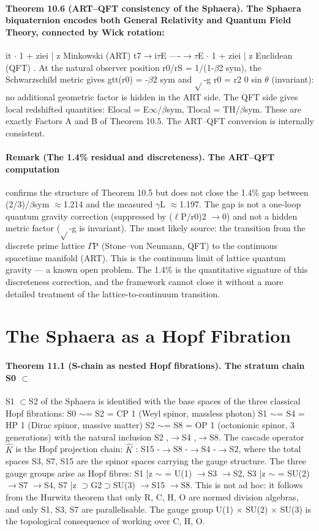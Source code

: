 \documentclass[12pt,a4paper]{article}
\begin{document}
\paragraph*{Theorem 10.6 (ART--QFT consistency of the Sphaera). The Sphaera biquaternion encodes both General Relativity and Quantum Field Theory, connected by Wick rotation:}
it $\cdot$ 1 + ziei | {z } Minkowski (ART) t7$\to$i$\tau$E ----$\to$$\tau$E $\cdot$ 1 + ziei | {z } Euclidean (QFT) . At the natural observer position r0/rS = 1/(1-$\beta$2 sym), the Schwarzschild metric gives gtt(r0) = -$\beta$2 sym and $\sqrt{}$-g
r0 = r2 0 sin $\theta$ (invariant): no additional geometric factor is hidden in the ART side. The QFT side gives local redshifted quantities: Elocal = E$\infty$/$\beta$sym, Tlocal = TH/$\beta$sym. These are exactly Factors A and B of Theorem 10.5. The ART--QFT conversion is internally consistent.
\paragraph*{Remark (The 1.4\% residual and discreteness). The ART--QFT computation}
confirms the structure of Theorem 10.5 but does not close the 1.4\% gap between (2/3)/$\beta$sym $\approx$1.214 and the measured $\gamma$L $\approx$1.197. The gap is not a one-loop
quantum gravity correction (suppressed by ($\ell$P/r0)2 $\to$0) and not a hidden metric factor ($\sqrt{}$-g is invariant). The most likely source: the transition from the discrete prime lattice $\Gamma$P (Stone--von Neumann, QFT) to the continuous spacetime manifold (ART). This is the continuum limit of lattice quantum gravity --- a known open problem. The 1.4\% is the quantitative signature of this discreteness correction, and the framework cannot close it without a more detailed treatment of the lattice-to-continuum transition.

\section{The Sphaera as a Hopf Fibration}
\paragraph*{Theorem 11.1 (S-chain as nested Hopf fibrations). The stratum chain S0 $\subset$}
S1 $\subset$S2 of the Sphaera is identified with the base spaces of the three classical Hopf fibrations: S0 $\sim$= S2 = CP 1 (Weyl spinor, massless photon) S1 $\sim$= S4 = HP 1 (Dirac spinor, massive matter) S2 $\sim$= S8 = OP 1 (octonionic spinor, 3 generations) with the natural inclusion S2 ,$\to$S4 ,$\to$S8. The cascade operator $\hat K$ is the Hopf projection chain: $\hat K$ : S15 -$\to$S8 -$\to$S4 -$\to$S2, where the total spaces S3, S7, S15 are the spinor spaces carrying the gauge structure. The three gauge groups arise as Hopf fibres: S1 |{z} $\sim$ = U(1) $\to$S3 $\to$S2, S3 |{z} $\sim$ = SU(2) $\to$S7 $\to$S4, S7 |{z} $\supset$G2$\supset$SU(3) $\to$S15 $\to$S8. This is not ad hoc: it follows from the Hurwitz theorem that only R, C, H, O are normed division algebras, and only S1, S3, S7 are parallelisable. The gauge group U(1) $\times$ SU(2) $\times$ SU(3) is the topological consequence of working over C, H, O.
\end{document}
